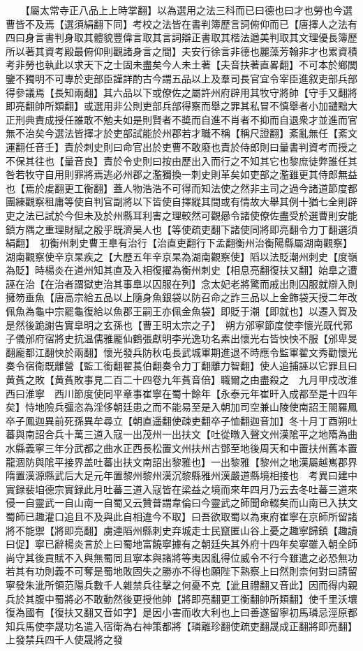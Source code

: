 　　【屬太常寺正八品上上時掌翻】以為選用之法三科而已曰德也曰才也勞也今選曹皆不及焉【選須絹翻下同】考校之法皆在書判簿歷言詞俯仰而已【唐擇人之法有四曰身言書判身取其體貌豐偉言取其言詞辯正書取其楷法遒美判取其文理優長簿歷所以著其資考殿最俯仰則觀諸身言之間】夫安行徐言非德也麗藻芳翰非才也累資積考非勞也執此以求天下之士固未盡矣今人未土著【夫音扶著直畧翻】不可本於鄉閭鑒不獨明不可專於吏部臣謹詳酌古今謂五品以上及羣司長官宜令宰臣進叙吏部兵部得參議焉【長知兩翻】其六品以下或僚佐之屬許州府辟用其牧守將帥【守手又翻將即亮翻帥所類翻】或選用非公則吏部兵部得察而舉之罪其私冒不慎舉者小加譴黜大正刑典責成授任誰敢不勉夫如是則賢者不奬而自進不肖者不抑而自退衆才並進而官無不治矣今選法皆擇才於吏部試能於州郡若才職不稱【稱尺證翻】紊亂無任【紊文運翻任音壬】責於刺史則曰命官出於吏曹不敢廢也責於侍郎則曰量書判資考而授之不保其往也【量音良】責於令史則曰按由歷出入而行之不知其它也黎庶徒弊誰任其咎若牧守自用則罪將焉逃必州郡之濫獨換一刺史則革矣如吏部之濫雖更其侍郎無益也【焉於䖍翻更工衡翻】蓋人物浩浩不可得而知法使之然非主司之過今諸道節度都團練觀察租庸等使自判官副將以下皆使自擇縱其間或有情故大舉其例十猶七全則辟吏之法已試於今但未及於州縣耳利害之理較然可觀曏令諸使僚佐盡受於選曹則安能鎮方隅之重理財賦之殷乎既濟吴人也【等使疏吏翻下諸使同將即亮翻令力丁翻選須絹翻】　初衡州刺史曹王臯有治行【治直吏翻行下孟翻衡州治衡陽縣屬湖南觀察】湖南觀察使辛京杲疾之【大歷五年辛京杲為湖南觀察使】䧟以法貶潮州刺史【度嶺為貶】時楊炎在道州知其直及入相復擢為衡州刺史【相息亮翻復扶又翻】始臯之遭誣在治【在治者謂獄吏治其事臯以囚服在列】念太妃老將驚而戚出則囚服就辯入則擁笏垂魚【唐高宗給五品以上隨身魚銀袋以防召命之詐三品以上金飾袋天授二年改佩魚為龜中宗罷龜復給以魚郡王嗣王亦佩金魚袋】即貶于潮【即就也】以遷入賀及是然後跪謝告實臯明之玄孫也【曹王明太宗之子】　朔方邠寧節度使李懷光既代郭子儀邠府宿將史抗温儒雅龎仙鶴張獻明李光逸功名素出懷光右皆怏怏不服【邠卑旻翻龐都江翻怏於兩翻】懷光發兵防秋屯長武城軍期進退不時應令監軍翟文秀勸懷光奏令宿衛既離營【監工銜翻翟萇伯翻奏令力丁翻離力智翻】使人追捕誣以它罪且曰黄萯之敗【黄萯敗事見二百二十四卷九年萯音倍】職爾之由盡殺之　九月甲戍改淮西曰淮寧　西川節度使同平章事崔寧在蜀十餘年【永泰元年崔旰入成都至是十四年矣】恃地險兵彊恣為淫侈朝廷患之而不能易至是入朝加司空兼山陵使南詔王閤羅鳳卒子鳳迦異前死孫異牟尋立【朝直遥翻使疎吏翻卒子恤翻迦音加】冬十月丁酉朔吐蕃與南詔合兵十萬三道入寇一出茂州一出扶文【吐從暾入聲文州漢隂平之地隋為曲水縣義寧三年分武都之曲水正西長松置文州扶州古鄧至地後周天和中置扶州舊本置龍涸防與隂平接界盖吐蕃出扶文南詔出黎雅也】一出黎雅【黎州之地漢屬越嶲郡界隋置漢源縣武后大足元年置黎州黎州漢沉黎縣雅州漢嚴道縣境相接也　考異曰建中實録裴垍德宗實録此月吐蕃三道入寇皆在梁益之境而來年四月乃云去冬吐蕃三道來侵一自靈武一自山南一自蜀又云贊普謂韋倫曰今靈武之師聞命輟矣而山南已入扶文蜀師已趣灌口追且不及與此自相違今不取】曰吾欲取蜀以為東府崔寧在京師所留諸將不能禦【將即亮翻】虜連䧟州縣刺史弃城走士民竄匿山谷上憂之趣寧歸鎮【趣讀曰促】寧已辭楊炎言於上曰蜀地富饒寧據有之朝廷失其外府十四年矣寧雖入朝全師尚守其後貢賦不入與無蜀同且寧本與諸將等夷因亂得位威令不行今雖遣之必恐無功若其有功則義不可奪是蜀地敗固失之勝亦不得也願陛下熟察上曰然則柰何對曰請留寧發朱泚所領范陽兵數千人雜禁兵往擊之何憂不克【泚且禮翻又音此】因而得内親兵於其腹中蜀將必不敢動然後更授他帥【將即亮翻更工衡翻帥所類翻】使千里沃壤復為國有【復扶又翻又音如字】是因小害而收大利也上曰善遂留寧初馬璘忌涇原都知兵馬使李晟功名遣入宿衛為右神策都將【璘離珍翻使疏吏翻晟成正翻將即亮翻】上發禁兵四千人使晟將之發
